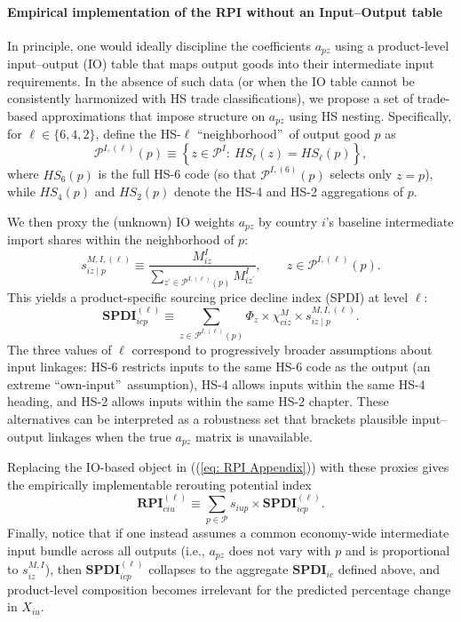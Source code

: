 \documentclass[english,12pt]{article}
\theoremstyle{definition}
\let\oldref\ref
\renewcommand{\ref}[1]{(\oldref{#1})}
\begin{document}
\paragraph{Empirical implementation of the RPI without an Input--Output table%
}

In principle, one would ideally discipline the coefficients $a_{pz}$ using a
product-level input--output (IO) table that maps output goods into their
intermediate input requirements. In the absence of such data (or when the IO
table cannot be consistently harmonized with HS trade classifications), we
propose a set of trade-based approximations that impose structure on $a_{pz}$
using HS nesting. Specifically, for $\ell \in \{6,4,2\}$, define the HS-$%
\ell $ \textquotedblleft neighborhood\textquotedblright\ of output good $p$
as 
\begin{equation*}
\mathcal{P}^{I,(\ell )}(p)\equiv \left\{ z\in \mathcal{P}^{I}:\ HS_{\ell
}(z)=HS_{\ell }(p)\right\} ,
\end{equation*}%
where $HS_{6}(p)$ is the full HS-6 code (so that $\mathcal{P}^{I,(6)}(p)$
selects only $z=p$), while $HS_{4}(p)$ and $HS_{2}(p)$ denote the HS-4 and
HS-2 aggregations of $p$.

We then proxy the (unknown) IO weights $a_{pz}$ by country $i$'s baseline
intermediate import shares within the neighborhood of $p$: 
\begin{equation*}
s_{iz\mid p}^{M,I,(\ell )}\equiv \frac{M_{iz}^{I}}{\sum_{z^{\prime }\in 
\mathcal{P}^{I,(\ell )}(p)}M_{iz^{\prime }}^{I}},\qquad z\in \mathcal{P}%
^{I,(\ell )}(p).
\end{equation*}%
This yields a product-specific sourcing price decline index (SPDI) at level $%
\ell $: 
\begin{equation*}
\boldsymbol{SPDI}_{icp}^{(\ell )}\equiv \sum_{z\in \mathcal{P}^{I,(\ell
)}(p)}\Phi _{z}\times \chi _{ciz}^{M}\times s_{iz\mid p}^{M,I,(\ell )}.
\end{equation*}%
The three values of $\ell $ correspond to progressively broader assumptions
about input linkages: HS-6 restricts inputs to the same HS-6 code as the
output (an extreme \textquotedblleft own-input\textquotedblright\
assumption), HS-4 allows inputs within the same HS-4 heading, and HS-2
allows inputs within the same HS-2 chapter. These alternatives can be
interpreted as a robustness set that brackets plausible input--output
linkages when the true $a_{pz}$ matrix is unavailable.

Replacing the IO-based object in (\ref{eq: RPI Appendix}) with these proxies
gives the empirically implementable rerouting potential index 
\begin{equation*}
\boldsymbol{RPI}_{ciu}^{(\ell )}\equiv \sum_{p\in \mathcal{P}}s_{iup}\times 
\boldsymbol{SPDI}_{icp}^{(\ell )}.
\end{equation*}%
Finally, notice that if one instead assumes a common economy-wide
intermediate input bundle across all outputs (i.e., $a_{pz}$ does not vary
with $p$ and is proportional to $s_{iz}^{M,I}$), then $\boldsymbol{SPDI}%
_{icp}^{(\ell )}$ collapses to the aggregate $\boldsymbol{SPDI}_{ic}$
defined above, and product-level composition becomes irrelevant for the
predicted percentage change in $X_{iu}$.
\end{document}
